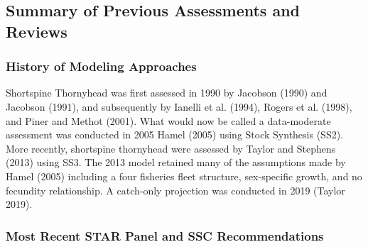 \documentclass[11pt,
  english,
  letterpaper,
]{article}
\begin{document}
\hypertarget{summary-of-previous-assessments-and-reviews}{%
\subsection{Summary of Previous Assessments and Reviews}\label{summary-of-previous-assessments-and-reviews}}

\hypertarget{history-of-modeling-approaches}{%
\subsubsection{History of Modeling Approaches}\label{history-of-modeling-approaches}}

Shortspine Thornyhead was first assessed in 1990 by Jacobson (1990) and Jacobson (1991), and subsequently by Ianelli et al. (1994), Rogers et al. (1998), and Piner and Methot (2001). What would now be called a data-moderate assessment was conducted in 2005 Hamel (2005) using Stock Synthesis (SS2). More recently, shortspine thornyhead were assessed by Taylor and Stephens (2013) using SS3. The 2013 model retained many of the assumptions made by Hamel (2005) including a four fisheries fleet structure, sex-specific growth, and no fecundity relationship. A catch-only projection was conducted in 2019 (Taylor 2019).

\hypertarget{most-recent-star-panel-and-ssc-recommendations}{%
\subsubsection{Most Recent STAR Panel and SSC Recommendations}\label{most-recent-star-panel-and-ssc-recommendations}}
\end{document}
